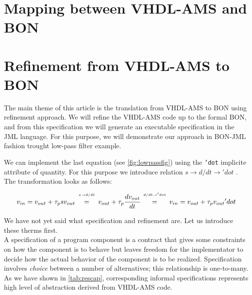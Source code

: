 \documentclass{article}
\begin{document}
\section{Mapping between VHDL-AMS and BON}
\label{sec:mappingVB}

\section{Refinement from VHDL-AMS to BON }
\label{sec:refVB}
The main theme of this article is the translation from VHDL-AMS to BON using 
refinement approach.
We will refine the VHDL-AMS code up to the formal BON, and from this 
specification we will generate an executable specification in the JML language.
For this purpose, we will demonstrate our approach in BON-JML fashion trought 
low-pass filter example.

We can implement the last equation (see \autoref{fig:lowpassfig}) using the \texttt{'dot} 
implicite attribute of quantity. For this purpose we introduce relation 
\texttt{$s \rightarrow d/dt \rightarrow 'dot$} . The transformation looks as follows: \\
\begin{equation}
v_{in} = v_{out} + \tau_psv_{out} 
   \begin{array}[b]{c}                                                                                                                                    
      {\scriptscriptstyle s \rightarrow d/dt}  \\=                                                                                                                  
   \end{array} 
v_{out} + \tau_p\cfrac{dv_{out}}{dt}
\begin{array}[b]{c}                                                                                                                                    
      {\scriptscriptstyle d/dt \rightarrow } {\scriptscriptstyle 'dot} \\=                                                                                                                  
   \end{array}
  v_{in} = v_{out} + \tau_pv_{out}{'dot} 
\end{equation} 

We have not yet said what specification and refinement are.
Let us introduce these therms first.\\ 
A specification of a program component is a contract that gives some constraints 
on how the component is to behave but leaves freedom for the implementator to 
decide how the actual behavior of the component is to be realized.
Specification involves \emph{choice} between a number of alternatives; this 
relationship is one-to-many. As we have shown in \autoref{tab:rescap}, corresponding 
informal specifications represents high level of abstraction derived from VHDL-AMS code.
\end{document}
